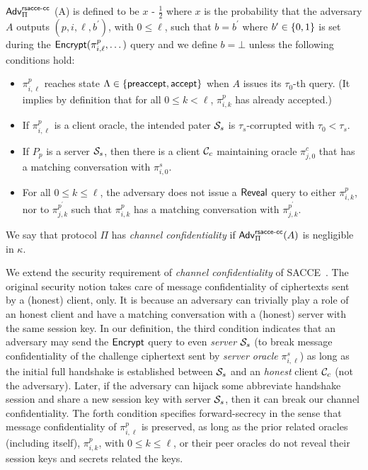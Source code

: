 \begin{definition} \label{def:rsacce-cc}
 $\mathsf{Adv}^{\mathsf{rsacce\textsc{-} cc}}_{\Pi}$ (A) is defined to be $x$ - $\frac{1}{2}$ where $x$ is the probability that the adversary $A$ outputs $(p, i, \ell, b^{\prime})$, with $0\leq \ell$,
 such that $b = b^{\prime}$ where $b^{\prime} \in \{0,1\}$ is set during the $\mathsf{Encrypt}(\pi^p_{i,\ell},\dots)$ query and we define $b=\bot$ unless the following conditions hold:
 \begin{itemize}
  \item{$\pi^p_{i,\ell}$ reaches state $\Lambda \in \{ \mathsf{preaccept}, \mathsf{accept} \}$ when $A$ issues
  its $\tau_0$-th query. (It implies by definition that for all $0\leq k < \ell$,
  $\pi^p_{i,k}$ has already accepted.)}

  \item{If $\pi^p_{i,\ell}$ is a client oracle,
  the intended pater $\mathcal{S}_s$ is $\tau_s$-corrupted with $\tau_0 < \tau_s$. }

  \item{If $P_p$ is a server $\mathcal{S}_s$, then there is a client $\mathcal{C}_c$ maintaining oracle $\pi^c_{j,0}$ that has a matching conversation with $\pi^s_{i,0}$.}

  \item{For all $0\leq k \leq \ell$, the adversary does not issue a $\mathsf{Reveal}$ query to
  either $\pi^p_{i,k}$, nor to $\pi^{p^{\prime}}_{j,k}$ such that $\pi^p_{i,k}$ has a matching conversation
  with $\pi^{p^{\prime}}_{j,k}$.}
 \end{itemize}
 We say that protocol $\Pi$ has \textit{channel confidentiality}
 if $\mathsf{Adv}^{\mathsf{rsacce\textsc{-} cc}}_{\Pi}(A)$ is negligible in $\kappa$.
\end{definition}

\begin{remark}
We extend the security requirement of \textit{channel confidentiality} of SACCE~\cite{KPW13:SACCE}.
The original security notion takes care of message confidentiality of ciphertexts sent by a (honest) client, only. It is because an adversary can trivially play a role of an honest client and
have a matching conversation with a (honest) server with the same session key. In our definition, the third condition indicates that an adversary may send the $\mathsf{Encrypt}$ query to even \textit{server} $\mathcal{S}_s$ (to break message confidentiality of the challenge ciphertext sent by \textit{server oracle} $\pi^s_{i,\ell}$) as long as the initial full handshake is established between
$\mathcal{S}_s$ and an \textit{honest} client $\mathcal{C}_c$ (not the adversary). Later, if the adversary can hijack some abbreviate handshake session and share a new session key with server $\mathcal{S}_s$, then it can break our channel confidentiality.
The forth condition specifies forward-secrecy in the sense that message confidentiality of $\pi^p_{i,\ell}$ is preserved, as long as the prior related oracles (including itself), $\pi^p_{i,k}$, with $0\leq k\leq \ell$, or their peer oracles do not reveal their session keys and secrets related the keys.
\end{remark}

